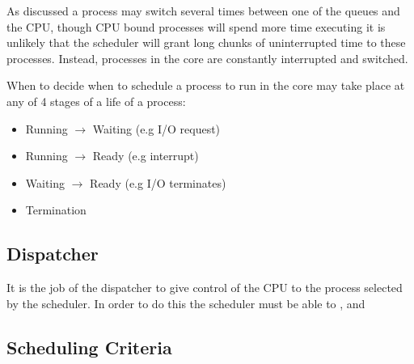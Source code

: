 

		\par{As discussed a process may switch several times between one of the queues and the CPU, though CPU bound processes will spend more time executing it is unlikely that the scheduler will grant long chunks of uninterrupted time to these processes. Instead, processes in the core are constantly interrupted and switched.}


		\par{When to decide when to schedule a process to run in the core may take place at any of 4 stages of a life of a process:}

			\begin{itemize}
				\item[] Running $\to$ Waiting (e.g I/O request)
				\item[] Running $\to$ Ready (e.g interrupt)
				\item[] Waiting $\to$ Ready (e.g I/O terminates)
				\item[] Termination 
			\end{itemize}

	\subsection{Dispatcher}


		\par{It is the job of the dispatcher to give control of the CPU to the process selected by the scheduler. In order to do this the scheduler must be able to ,  and }


	\subsection{Scheduling Criteria}

